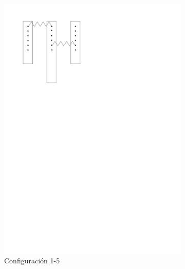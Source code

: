 \begin{figure}[htbp!]
  \centering
  \begin{subfigure}[b]{0.3\textwidth}
    \centering
    \includegraphics[width=\linewidth]{./Figures/15.pdf}
    \caption{Configuraci\'on 1-5}
    \label{fig:conf-1-5}
  \end{subfigure}
  \hfill
  \begin{subfigure}[b]{0.3\textwidth}
    \centering

\end{subfigure}
\end{figure}
